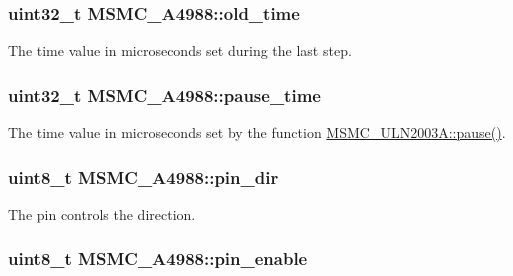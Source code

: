 \hypertarget{class_m_s_m_c___a4988_a60ff02342382a71526d14fb9e51ddc2a}{
\subsubsection[{old\+\_\+time}]{\setlength{\rightskip}{0pt plus 5cm}uint32\+\_\+t M\+S\+M\+C\+\_\+\+A4988\+::old\+\_\+time\hspace{0.3cm}{\ttfamily [private]}}}\label{class_m_s_m_c___a4988_a60ff02342382a71526d14fb9e51ddc2a}


The time value in microseconds set during the last step. 

\hypertarget{class_m_s_m_c___a4988_a3c4854c40c6d9db5e37698eea2debd70}{
\subsubsection[{pause\+\_\+time}]{\setlength{\rightskip}{0pt plus 5cm}uint32\+\_\+t M\+S\+M\+C\+\_\+\+A4988\+::pause\+\_\+time\hspace{0.3cm}{\ttfamily [private]}}}\label{class_m_s_m_c___a4988_a3c4854c40c6d9db5e37698eea2debd70}


The time value in microseconds set by the function \hyperlink{class_m_s_m_c___u_l_n2003_a_aa1d3444465d59ca6c87f05f565dde4a2}{M\+S\+M\+C\+\_\+\+U\+L\+N2003\+A\+::pause()}. 

\hypertarget{class_m_s_m_c___a4988_a2bc9676a272bcd6604aaf8b08ac07109}{
\subsubsection[{pin\+\_\+dir}]{\setlength{\rightskip}{0pt plus 5cm}uint8\+\_\+t M\+S\+M\+C\+\_\+\+A4988\+::pin\+\_\+dir\hspace{0.3cm}{\ttfamily [private]}}}\label{class_m_s_m_c___a4988_a2bc9676a272bcd6604aaf8b08ac07109}


The pin controls the direction. 

\hypertarget{class_m_s_m_c___a4988_a822c3db98367f3e60347a13d1d16170b}{
\subsubsection[{pin\+\_\+enable}]{\setlength{\rightskip}{0pt plus 5cm}uint8\+\_\+t M\+S\+M\+C\+\_\+\+A4988\+::pin\+\_\+enable\hspace{0.3cm}{\ttfamily [private]}}}\label{class_m_s_m_c___a4988_a822c3db98367f3e60347a13d1d16170b}


